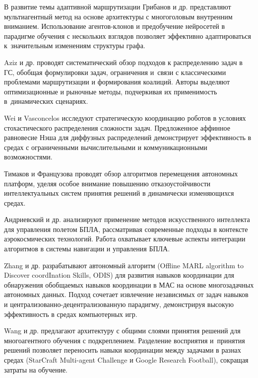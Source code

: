 В развитие темы адаптивной маршрутизации Грибанов и др. \cite{GribanovFilchenkovAzarovShalito2022} представляют мультиагентный метод на основе архитектуры с многоголовым внутренним вниманием. Использование агентов-клонов и предобучение нейросетей в парадигме обучения с нескольких взглядов позволяет эффективно адаптироваться к~значительным изменениям структуры графа.

Aziz и др. \cite{aziz2022taskallocationusingteam} проводят систематический обзор подходов к распределению задач в ГС, обобщая формулировки задач, ограничения и~связи с классическими проблемами маршрутизации и формирования коалиций. Авторы выделяют оптимизационные и рыночные методы, подчеркивая их применимость в~динамических сценариях.

Wei и Vasconcelos \cite{wei2022} исследуют стратегическую координацию роботов в условиях стохастического распределения сложности задач. Предложенное аффинное равновесие Нэша для диффузных распределений демонстрирует эффективность в средах с ограниченными вычислительными и коммуникационными возможностями.

Тимаков и Французова \cite{TimakovFrancuzova2023} проводят обзор алгоритмов перемещения автономных платформ, уделяя особое внимание повышению отказоустойчивости интеллектуальных систем принятия решений в динамически изменяющихся средах.

Андриевский и др. \cite{AndrievskiiPopovMickailovPopov2023} анализируют применение методов искусственного интеллекта для управления полетом БПЛА, рассматривая современные подходы в контексте аэрокосмических технологий. Работа охватывает ключевые аспекты интеграции алгоритмов в системы навигации и управления БПЛА.

Zhang и др. \cite{Zhang2023DiscoveringGM} разрабатывают автономный алгоритм (Offline MARL algorithm to Discover coordInation Skills, ODIS) для развития навыков координации для обнаружения обобщаемых навыков координации в МАС на основе многозадачных автономных данных. Подход сочетает извлечение независимых от задач навыков и централизованно-децентрализованную парадигму, демонстрируя высокую эффективность в средах компьютерных игр.

Wang и др. \cite{wang2023multitaskmultiagentsharedlayers} предлагают архитектуру с общими слоями принятия решений для многоагентного обучения с подкреплением. Разделение восприятия и~принятия решений позволяет переносить навыки координации между задачами в разнах средах (StarCraft Multi-agent Challenge и Google Research Football), сокращая затраты на обучение.

